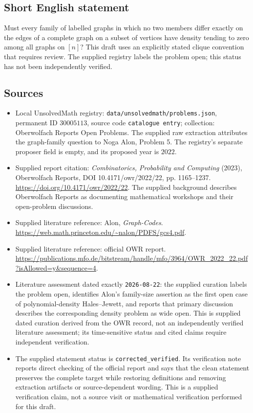 \documentclass[11pt]{article}
\begin{document}
\subsection{Short English statement}
Must every family of labelled graphs in which no two members differ exactly on the edges of a complete graph on a subset of vertices have density tending to zero among all graphs on \([n]\)? This draft uses an explicitly stated clique convention that requires review. The supplied registry labels the problem open; this status has not been independently verified.
\subsection{Sources}
\begin{itemize}
\item Local UnsolvedMath registry: \texttt{data/unsolvedmath/problems.json}, permanent ID \(30005113\), source code \texttt{catalogue entry}; collection: Oberwolfach Reports Open Problems. The supplied raw extraction attributes the graph-family question to Noga Alon, Problem 5. The registry's separate proposer field is empty, and its proposed year is \(2022\).
\item Supplied report citation: \emph{Combinatorics, Probability and Computing} (2023), Oberwolfach Reports, DOI 10.4171/owr/2022/22, pp. 1165--1237. \url{https://doi.org/10.4171/owr/2022/22}. The supplied background describes Oberwolfach Reports as documenting mathematical workshops and their open-problem discussions.
\item Supplied literature reference: Alon, \emph{Graph-Codes}. \url{https://web.math.princeton.edu/~nalon/PDFS/gcs4.pdf}.
\item Supplied literature reference: official OWR report. \url{https://publications.mfo.de/bitstream/handle/mfo/3964/OWR_2022_22.pdf?isAllowed=y&sequence=4}.
\item Literature assessment dated exactly \texttt{2026-08-22}: the supplied curation labels the problem open, identifies Alon's family-size assertion as the first open case of polynomial-density Hales--Jewett, and reports that primary discussion describes the corresponding density problem as wide open. This is supplied dated curation derived from the OWR record, not an independently verified literature assessment; its time-sensitive status and cited claims require independent verification.
\item The supplied statement status is \texttt{corrected\_verified}. Its verification note reports direct checking of the official report and says that the clean statement preserves the complete target while restoring definitions and removing extraction artifacts or source-dependent wording. This is a supplied verification claim, not a source visit or mathematical verification performed for this draft.
\end{itemize}
\end{document}

